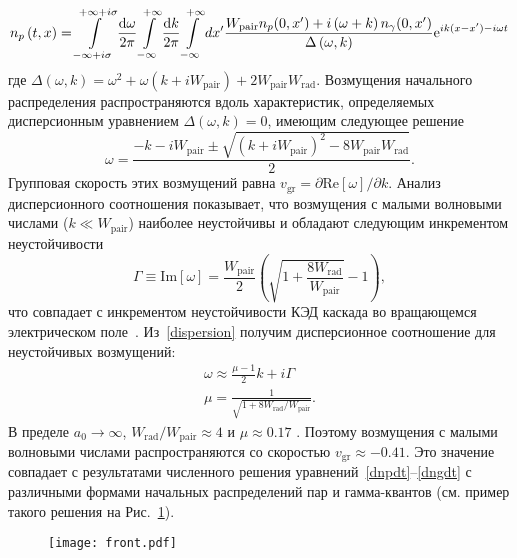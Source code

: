\begin{equation}
    \label{np}
    n_{p}\left(t,x\right) = \intop_{-\infty+i\sigma}^{+\infty+i\sigma}\frac{\dd\omega}{2\pi}\intop_{-\infty}^{+\infty}\frac{\dd k}{2\pi}\intop_{-\infty}^{+\infty}dx' 
    \frac{W_\mathrm{pair}n_{p}(0,x')+i\left(\omega+k\right)n_{\gamma}(0,x')}{\Delta\left(\omega,k\right)} \mathrm{e}^{ik(x-x')-i\omega t}
\end{equation}
где $\Delta\left(\omega,k\right)=\omega^{2}+\omega(k + iW_\mathrm{pair})+2W_\mathrm{pair}W_\mathrm{rad}$. 
Возмущения начального распределения распространяются вдоль характеристик, определяемых дисперсионным уравнением $\Delta\left(\omega,k\right)=0$, имеющим следующее решение
\begin{equation}
    \label{dispersion}
    \omega=\frac{-k-i W_\mathrm{pair} \pm\sqrt{(k+i W_\mathrm{pair})^{2}-8 W_\mathrm{pair}W_\mathrm{rad}}}{2}. 
\end{equation}
Групповая скорость этих возмущений равна $v_\mathrm{gr}=\partial\mathrm{Re}[\omega]/\partial k$. 
Анализ дисперсионного соотношения показывает, что возмущения с малыми волновыми числами ($k\ll W_\mathrm{pair}$) наиболее неустойчивы и обладают следующим инкрементом неустойчивости
\begin{equation}
    \Gamma \equiv \mathrm{Im}\left[\omega\right] =\frac{W_\mathrm{pair}}{2} \left(\sqrt{1+\frac{8 W_\mathrm{rad}}{W_\mathrm{pair}}}-1\right),
    \label{gamma}
\end{equation}
что совпадает с инкрементом неустойчивости КЭД каскада во вращающемся электрическом поле~\cite{bashmakov2014effect,grismayer2017seeded}. 
Из~\eqref{dispersion} получим дисперсионное соотношение для неустойчивых возмущений:
\begin{gather}
    \omega \approx  \frac{\mu-1}{2}k + i\Gamma \\
    \mu =  \frac{1}{\sqrt{1+8 W_\mathrm{rad}/W_\mathrm{pair}}}.
    \label{omega}
\end{gather} 
В пределе $a_0 \rightarrow \infty$, $W_\mathrm{rad}/W_\mathrm{pair} \approx 4$ и $\mu \approx0.17$ \cite{berestetskii1982quantum}. 
Поэтому возмущения с малыми волновыми числами распространяются со скоростью ${v_\mathrm{gr}\approx -0.41}$.
Это значение совпадает с результатами численного решения уравнений~\eqref{dnpdt}--\eqref{dngdt} с различными формами начальных распределений пар и гамма-квантов (см. пример такого решения на Рис.~\ref{front}).
\begin{figure}[ht]
	\texttt{[image: front.pdf]}
    \caption[Численное решение упрощенных уравнений, описывающих развитие КЭД каскада в плоской волне]{\label{front} }
\end{figure}
